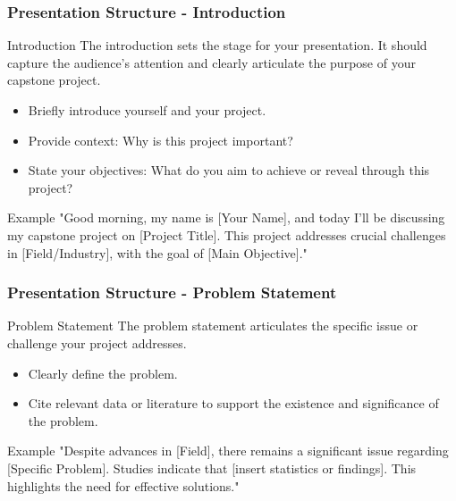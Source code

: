 \documentclass{beamer}
\begin{document}
\begin{frame}[fragile]
    \frametitle{Presentation Structure - Introduction}
    \begin{block}{Introduction}
        The introduction sets the stage for your presentation. It should capture the audience's attention and clearly articulate the purpose of your capstone project.
    \end{block}
    \begin{itemize}
        \item Briefly introduce yourself and your project.
        \item Provide context: Why is this project important?
        \item State your objectives: What do you aim to achieve or reveal through this project?
    \end{itemize}
    \begin{exampleblock}{Example}
        "Good morning, my name is [Your Name], and today I’ll be discussing my capstone project on [Project Title]. This project addresses crucial challenges in [Field/Industry], with the goal of [Main Objective]."
    \end{exampleblock}
\end{frame}

\begin{frame}[fragile]
    \frametitle{Presentation Structure - Problem Statement}
    \begin{block}{Problem Statement}
        The problem statement articulates the specific issue or challenge your project addresses.
    \end{block}
    \begin{itemize}
        \item Clearly define the problem.
        \item Cite relevant data or literature to support the existence and significance of the problem.
    \end{itemize}
    \begin{exampleblock}{Example}
        "Despite advances in [Field], there remains a significant issue regarding [Specific Problem]. Studies indicate that [insert statistics or findings]. This highlights the need for effective solutions."
    \end{exampleblock}
\end{frame}
\end{document}

